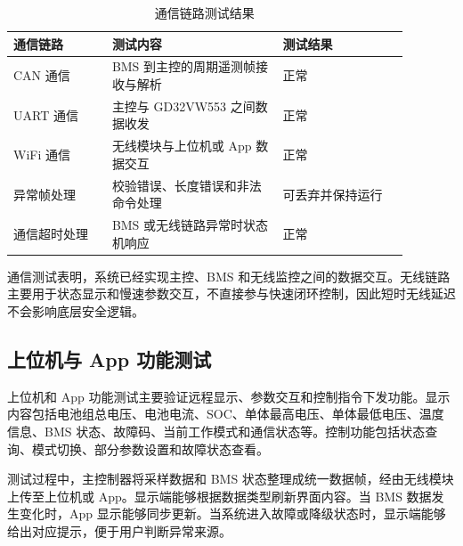 \begin{table}[htbp]
  \centering
  \caption{通信链路测试结果}
  \label{tab:communication_test}
  \renewcommand{\arraystretch}{1.2}
  \begin{tabular}{|m{0.22\linewidth}|m{0.38\linewidth}|m{0.28\linewidth}|}
    \hline
    \rule{0pt}{1.0cm}通信链路 & 测试内容 & 测试结果 \\
    \hline
    \rule{0pt}{1.0cm}CAN 通信 & BMS 到主控的周期遥测帧接收与解析 & 正常 \\
    \hline
    \rule{0pt}{1.0cm}UART 通信 & 主控与 GD32VW553 之间数据收发 & 正常 \\
    \hline
    \rule{0pt}{1.0cm}WiFi 通信 & 无线模块与上位机或 App 数据交互 & 正常 \\
    \hline
    \rule{0pt}{1.0cm}异常帧处理 & 校验错误、长度错误和非法命令处理 & 可丢弃并保持运行 \\
    \hline
    \rule{0pt}{1.0cm}通信超时处理 & BMS 或无线链路异常时状态机响应 & 正常 \\
    \hline
  \end{tabular}
\end{table}

通信测试表明，系统已经实现主控、BMS 和无线监控之间的数据交互。无线链路主要用于状态显示和慢速参数交互，不直接参与快速闭环控制，因此短时无线延迟不会影响底层安全逻辑。

\subsection{上位机与 App 功能测试}

上位机和 App 功能测试主要验证远程显示、参数交互和控制指令下发功能。显示内容包括电池组总电压、电池电流、SOC、单体最高电压、单体最低电压、温度信息、BMS 状态、故障码、当前工作模式和通信状态等。控制功能包括状态查询、模式切换、部分参数设置和故障状态查看。

测试过程中，主控制器将采样数据和 BMS 状态整理成统一数据帧，经由无线模块上传至上位机或 App。显示端能够根据数据类型刷新界面内容。当 BMS 数据发生变化时，App 显示能够同步更新。当系统进入故障或降级状态时，显示端能够给出对应提示，便于用户判断异常来源。


